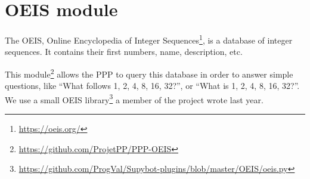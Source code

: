 \section{OEIS module}

The OEIS, Online Encyclopedia of Integer Sequences\footnote{\url{https://oeis.org/}}, is a database of integer
sequences. It contains their first numbers, name, description, etc.

This module\footnote{\url{https://github.com/ProjetPP/PPP-OEIS}} allows the
PPP to query this database in order to answer simple questions, like
“What follows 1, 2, 4, 8, 16, 32?”, or “What is 1, 2, 4, 8, 16, 32?”. We use a small OEIS library\footnote{\url{https://github.com/ProgVal/Supybot-plugins/blob/master/OEIS/oeis.py}}
a member of the project wrote last year.
